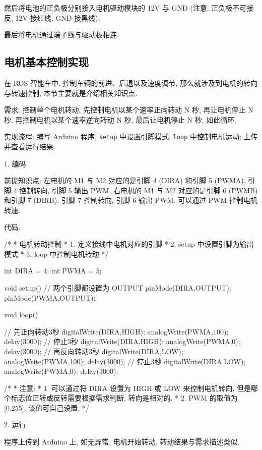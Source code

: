 \documentclass[openany, fontset=windowsold]{ctexbook}
\theoremstyle{kaiti}
\theoremstyle{normal}
\begin{document}
然后将电池的正负极分别接入电机驱动模块的 12V 与 GND (注意: 正负极不可接反, 12V 接红线, GND 接黑线); 

最后将电机通过端子线与驱动板相连.

\subsection{电机基本控制实现}

在 ROS 智能车中, 控制车辆的前进、后退以及速度调节, 那么就涉及到电机的转向与转速控制, 本节主要就是介绍相关知识点.

需求: 控制单个电机转动, 先控制电机以某个速率正向转动 N 秒, 再让电机停止 N 秒, 再控制电机以某个速率逆向转动 N 秒, 最后让电机停止 N 秒, 如此循环.

实现流程: 编写 Arduino 程序, \verb|setup| 中设置引脚模式, \verb|loop| 中控制电机运动; 上传并查看运行结果.

1. 编码

前提知识点: 左电机的 M1 与 M2 对应的是引脚 4 (DIRA) 和引脚 5 (PWMA), 引脚 4 控制转向, 引脚 5 输出 PWM. 右电机的 M1 与 M2 对应的是引脚 6 (PWMB) 和引脚 7 (DIRB), 引脚 7 控制转向, 引脚 6 输出 PWM. 可以通过 PWM 控制电机转速.

代码:

\begin{cpp}
  /*
   * 电机转动控制
   * 1. 定义接线中电机对应的引脚
   * 2. setup 中设置引脚为输出模式
   * 3. loop 中控制电机转动
   */

  int DIRA = 4;
  int PWMA = 5;

  void setup() {
    // 两个引脚都设置为 OUTPUT
    pinMode(DIRA,OUTPUT);
    pinMode(PWMA,OUTPUT);
  }

  void loop() {
    // 先正向转动3秒
    digitalWrite(DIRA,HIGH);
    analogWrite(PWMA,100);
    delay(3000);
    // 停止3秒
    digitalWrite(DIRA,HIGH);
    analogWrite(PWMA,0);
    delay(3000);
    // 再反向转动3秒
    digitalWrite(DIRA,LOW);
    analogWrite(PWMA,100);
    delay(3000);
    // 停止3秒
    digitalWrite(DIRA,LOW);
    analogWrite(PWMA,0);
    delay(3000);

    /*
     * 注意: 
     * 1. 可以通过将 DIRA 设置为 HIGH 或 LOW 来控制电机转向, 但是哪个标志位正转或反转需要根据需求判断, 转向是相对的.
     * 2. PWM 的取值为 [0,255], 该值可自己设置.
     */

  }
\end{cpp}

2. 运行

程序上传到 Arduino 上, 如无异常, 电机开始转动, 转动结果与需求描述类似.
\end{document}
